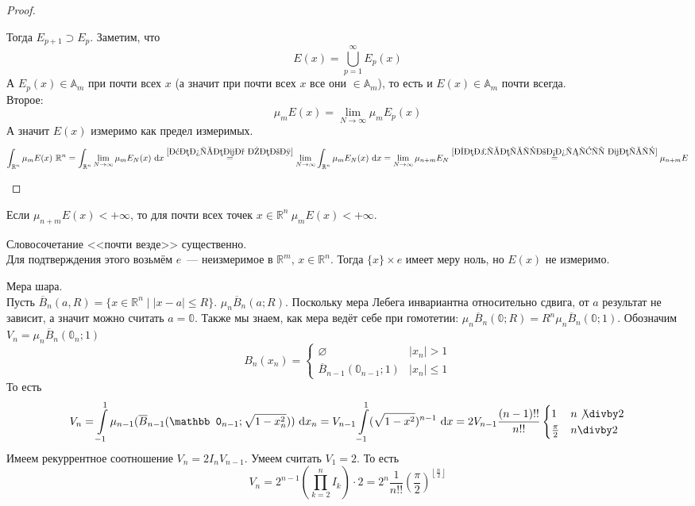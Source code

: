 \documentclass{article}
\begin{document}
\begin{proof}
\begin{enumerate}[a.]
$$            $$
            Тогда $E_{p+1}\supset E_p$. Заметим, что
            $$
            E(x)=\bigcup\limits_{p=1}^\infty E_p(x)
            $$
            А $E_p(x)\in\mathbb A_m$ при почти всех $x$ (а значит при почти всех $x$ все они $\in\mathbb A_m$), то есть и $E(x)\in\mathbb A_m$ почти всегда.\\
            Второе:
            $$
            \mu_mE(x)=\lim\limits_{N\to\infty}\mu_mE_p(x)
            $$
            А значит $E(x)$ измеримо как предел измеримых.
            $$
            \int_{\mathbb R^n}\mu_mE(x)~\mathbb R^n=\int_{\mathbb R^n}\lim\limits_{N\to\infty}\mu_mE_N(x)~\mathrm dx\overset{\ref{Теорема Леви}}=\lim\limits_{N\to\infty}\int_{\mathbb R^n}\mu_mE_N(x)~\mathrm dx=\lim\limits_{N\to\infty}\mu_{n+m}E_N\overset{\ref{Непрерывность меры}}=\mu_{n+m}E
            $$
        \end{enumerate}
    \end{proof}
    \begin{remark}
        Если $\mu_{n+m}E(x)<+\infty$, то для почти всех точек $x\in\mathbb R^n~\mu_mE(x)<+\infty$.
    \end{remark}
    \begin{remark}
        Словосочетание <<почти везде>> существенно.\\
        Для подтверждения этого возьмём $e$~--- неизмеримое в $\mathbb R^m$, $x\in\mathbb R^n$. Тогда $\{x\}\times e$ имеет меру ноль, но $E(x)$ не измеримо.
    \end{remark}
    \begin{example}
        Мера шара.\\
        Пусть $\overline B_n(a,R)=\{x\in\mathbb R^n\mid |x-a|\leqslant R\}$. $\mu_n\overline B_n(a;R)$. Поскольку мера Лебега инвариантна относительно сдвига, от $a$ результат не зависит, а значит можно считать $a=\mathbb0$. Также мы знаем, как мера ведёт себе при гомотетии: $\mu_n\overline B_n(\mathbb0;R)=R^n\mu_n\overline B_n(\mathbb0;1)$. Обозначим $V_n=\mu_n\overline B_n(\mathbb 0_n;1)$
        $$B_n(x_n)=\begin{cases}
            \varnothing & |x_n|>1\\
            \overline B_{n-1}(\mathbb 0_{n-1};1) & |x_n|\leqslant 1
        \end{cases}$$
        То есть
        $$
        V_n=\int\limits_{-1}^1\mu_{n-1}(\overline B_{n-1}(\mathbb0_{n-1};\sqrt{1-x_n^2}))~\mathrm dx_n=V_{n-1}\int\limits_{-1}^1(\sqrt{1-x^2})^{n-1}~\mathrm dx=2V_{n-1}\frac{(n-1)!!}{n!!}\begin{cases}
            1 & n\not\divby2\\
            \frac\pi2 & n\divby 2
        \end{cases}
        $$
        Имеем рекуррентное соотношение $V_n=2I_nV_{n-1}$. Умеем считать $V_1=2$. То есть
        $$
        V_n=2^{n-1}\left(\prod\limits_{k=2}^nI_k\right)\cdot2=2^n\frac1{n!!}\left(\frac\pi2\right)^{\left\lfloor\frac n2\right\rfloor}
        $$
    \end{example}
\end{document}
